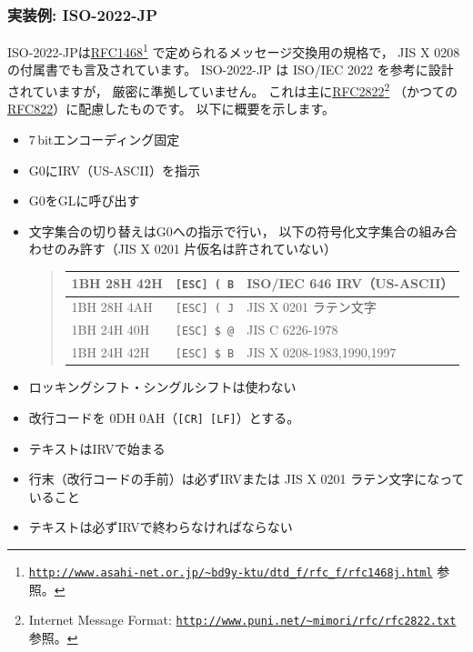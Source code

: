 \documentclass[a4j,10pt,fleqn,uplatex]{jsarticle}
\begin{document}
\subsubsection{実装例: ISO-2022-JP} \label{sec:iso-2022-jp}

ISO-2022-JPは\href{ftp://ftp.isi.edu/in-notes/rfc1468.txt}{RFC1468}\footnote{
    \href{http://www.asahi-net.or.jp/~bd9y-ktu/dtd_f/rfc_f/rfc1468j.html}{\texttt{http://www.asahi-net.or.jp/\~{}bd9y-ktu/dtd\_f/rfc\_f/rfc1468j.html}} 参照。
} で定められるメッセージ交換用の規格で，
JIS X 0208 の付属書でも言及されています。
ISO-2022-JP は ISO/IEC 2022 を参考に設計されていますが，
厳密に準拠していません。
これは主に\href{ftp://ftp.isi.edu/in-notes/rfc2822.txt}{RFC2822}\footnote{
    Internet Message Format: \href{http://www.puni.net/~mimori/rfc/rfc2822.txt}{\texttt{http://www.puni.net/\~{}mimori/rfc/rfc2822.txt}} 参照。
} （かつての\href{ftp://ftp.isi.edu/in-notes/rfc822.txt}{RFC822}）に配慮したものです。
以下に概要を示します。
\begin{itemize}
\item 7\,bitエンコーディング固定
\item G0にIRV（US-ASCII）を指示
\item G0をGLに呼び出す
\item 文字集合の切り替えはG0への指示で行い，
    以下の符号化文字集合の組み合わせのみ許す（JIS X 0201 片仮名は許されていない）
    \begin{quote}\begin{tabular}{|l|l||l|}
        \hline
        1BH 28H 42H & \texttt{[ESC] ( B}  & ISO/IEC 646 IRV（US-ASCII） \\ \hline
        1BH 28H 4AH & \texttt{[ESC] ( J}  & JIS X 0201 ラテン文字 \\ \hline
        1BH 24H 40H & \texttt{[ESC] \$ @} & JIS C 6226-1978 \\ \hline
        1BH 24H 42H & \texttt{[ESC] \$ B} & JIS X 0208-1983,1990,1997 \\ \hline
    \end{tabular}\end{quote}
\item ロッキングシフト・シングルシフトは使わない
\item 改行コードを 0DH 0AH（\texttt{[CR] [LF]}）とする。
\item テキストはIRVで始まる
\item 行末（改行コードの手前）は必ずIRVまたは JIS X 0201 ラテン文字になっていること
\item テキストは必ずIRVで終わらなければならない
\end{itemize}
\end{document}
